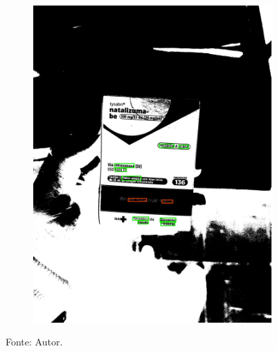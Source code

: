 \begin{figure}[htb]
\begin{subfigure}[t]{0.21\textwidth}
        \includegraphics[width=\linewidth]{../pictures/tysabri_cmyk_k_only_thresh_boxes.jpg}
    \end{subfigure}
    \caption*{Fonte: Autor.}
    \label{fig:foto:versoes:2}
\end{figure}

















